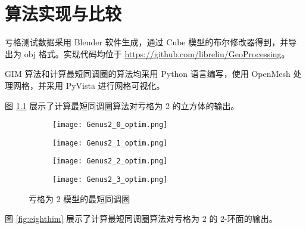 
\chapter{算法实现与比较}

亏格测试数据采用 Blender 软件生成，通过 Cube 模型的布尔修改器得到，并导出为 obj 格式。实现代码均位于 \url{https://github.com/libreliu/GeoProcessing}。

GIM 算法和计算最短同调圈的算法均采用 Python 语言编写，使用 OpenMesh 处理网格，并采用 PyVista 进行网格可视化。

图 \ref{fig:genus2him} 展示了计算最短同调圈算法对亏格为 2 的立方体的输出。

\begin{figure}[h]
    \centering
    \begin{subfigure}{.2\textwidth}
        \centering
        \texttt{[image: Genus2\_0\_optim.png]}
    \end{subfigure}
    \begin{subfigure}{.2\textwidth}
        \centering
        \texttt{[image: Genus2\_1\_optim.png]}
    \end{subfigure}
    \begin{subfigure}{.2\textwidth}
        \centering
        \texttt{[image: Genus2\_2\_optim.png]}
    \end{subfigure}
    \begin{subfigure}{.2\textwidth}
        \centering
        \texttt{[image: Genus2\_3\_optim.png]}
    \end{subfigure}
    \caption{亏格为 2 模型的最短同调圈}
    \label{fig:genus2him}
\end{figure}

图 \ref{fig:eighthim} 展示了计算最短同调圈算法对亏格为 2 的 2-环面的输出。

